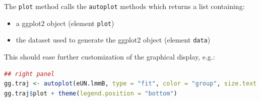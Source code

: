 \documentclass[12pt]{article}
\begin{document}
\clearpage

The \texttt{plot} method calls the \texttt{autoplot} methods which returns a list
containing:
\begin{itemize}
\item a ggplot2 object (element \texttt{plot})
\item the dataset used to generate the ggplot2 object (element \texttt{data})
\end{itemize}
This should ease further customization of the graphical display, e.g.:
\begin{lstlisting}[language=r,numbers=none]
## right panel
gg.traj <- autoplot(eUN.lmmB, type = "fit", color = "group", size.text = 20, facet =~id)
gg.traj$plot + theme(legend.position = "bottom")
\end{lstlisting}
\end{document}
